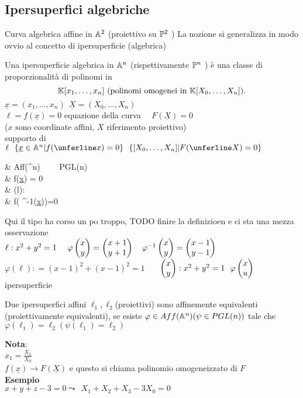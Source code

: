 \documentclass[12px]{article}
\begin{document}
\subsection{Ipersuperfici algebriche}
	Curva algebrica affine in $\mathbb{A}^2$ (proiettivo su $\mathbb{P}^2$ ) La nozione si generalizza in modo ovvio al concetto di ipersuperficie (algebrica)
	\begin{defi}
		Una ipersuperficie algebrica in $\mathbb{A}^n$ (rispettivamente $\mathbb{P}^n$ ) è una classe di proporzionalità di polinomi in
		\[
			\mathbb{K}[x_1,\ldots,x_n] \text{ (polinomi omogenei in } \mathbb{K}[X_0,\ldots,X_n])
		.\] 
		$\underline{x} = (x_1,\ldots,x_n) \ \ \underline X = (X_0,\ldots,X_n)$\\
		$\ell = f(\underline x) = 0$ equazione della curva \ \ $F(\underline X)=0$\\
		($x$ sono coordinate affini, $X$ riferimento proiettivo)\\
		supporto di $\ell\ \ \{\underline x\in\A^n|f(\unferline x)=0\}\ \ \{[X_0,\ldots,X_n]|F(\unferline X) =0 \}$ \\
		 \begin{aligend}
			& \varphi\in Aff(\A^n) \ \ \ \ \psi \in PGL(n)\\
			& \ell {} f(\underline x) = 0\\
			&  \varphi(l): \\
			& f( \varphi^{-1}(\underline x))=0
		\end{aligend}
	\end{defi}
	Qui il tipo ha corso un po troppo, TODO finire la definizioen e ci sta una mezza osservazione\\
	$\ell : x^2 + y^2 = 1 \ \ \ \ \varphi\matrice{x\\y} = \matrice{x+1\\y+1}\ \ \ \varphi^{-1}\matrice{x\\y}=\matrice{x-1\\y-1}$\\
	$ \varphi(\ell): = (x-1)^2+(x-1)^2 = 1$ \ \ \ $\matrice{x\\y}:x^2 + y^2=1 \ \ \varphi\matrice{x\\u} $ ipersuperficie
	\begin{defi}
		Due ipersuperfici affini $\ell_1,\ell_2$(proiettivi) sono affinemente equivalenti (proiettivamente equivalenti), se esiste $ \varphi\in Aff(\mathbb{A}^n) (\psi \in PGL(n))
		\\$ 
		tale che $ \varphi(\ell_1)=\ell_2 (\psi(\ell_1) = \ell_2)$
	\end{defi}
	\textbf{Nota}:\\
	$x_1 = \frac {X_1} {X_0}$\\
	$f(\underline x) \rightarrow F(\underline X)$ e questo si chiama polinomio omogeneizzato di $F$ \\
	\textbf{Esempio}\\
$x + y + z - 3 = 0 \leadsto \ \ X_1+X_2+X_3-3X_0=0$
\end{document}
